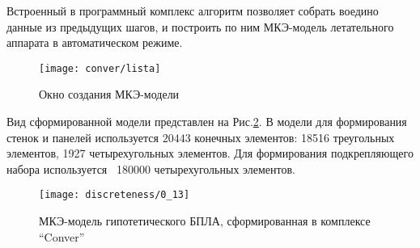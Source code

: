  

 Встроенный в программный комплекс алгоритм позволяет собрать воедино данные из предыдущих шагов, и построить по ним МКЭ-модель летательного аппарата в автоматическом режиме. 

\begin{figure}[H]
\centering
\texttt{[image: conver/lista]}
\caption{Окно создания МКЭ-модели}
\label{fig:conver_lista}
\end{figure}


Вид сформированной модели представлен на Рис.\ref{fig:converReadyModel}. В модели для формирования стенок и панелей используется $20443$  конечных элементов: 18516 треугольных элементов, 1927 четырехугольных элементов. Для формирования подкрепляющего набора используется ~180000 четырехугольных элементов.


\begin{figure}[ht]
\centering
\texttt{[image: discreteness/0\_13]}
\caption{МКЭ-модель гипотетического БПЛА, сформированная в комплексе ``Conver''}
\label{fig:converReadyModel}
\end{figure}
